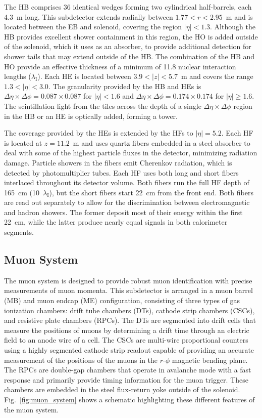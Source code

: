 The HB comprises 36 identical wedges forming two cylindrical half-barrels, each 4.3~m long. This subdetector extends radially between $1.77 < r < 2.95$~m and is located between the EB and solenoid, covering the region $|\eta| < 1.3$. Although the HB provides excellent shower containment in this region, the HO is added outside of the solenoid, which it uses as an absorber, to provide additional detection for shower tails that may extend outside of the HB. The combination of the HB and HO provide an effective thickness of a minimum of 11.8 nuclear interaction lengths ($\lambda_\mathrm{I}$). Each HE is located between $3.9 < |z| < 5.7$~m  and covers the range $1.3 < |\eta| < 3.0$. The granularity provided by the HB and HEs is $\Delta\eta{\times}\Delta\phi = 0.087{\times}0.087$ for $|\eta| < 1.6$ and $\Delta\eta{\times}\Delta\phi = 0.174{\times}0.174$ for $|\eta| \ge 1.6$. The scintillation light from the tiles across the depth of a single $\Delta\eta{\times}\Delta\phi$ region in the HB or an HE is optically added, forming a tower.

The coverage provided by the HEs is extended by the HFs to $|\eta| = 5.2$. Each HF is located at $z = 11.2$~m and uses quartz fibers embedded in a steel absorber to deal with some of the highest particle fluxes in the detector, minimizing radiation damage. Particle showers in the fibers emit Cherenkov radiation, which is detected by photomultiplier tubes. Each HF uses both long and short fibers interlaced throughout its detector volume. Both fibers run the full HF depth of 165~cm (10~$\lambda_\mathrm{I}$), but the short fibers start 22~cm from the front end. Both fibers are read out separately to allow for the discrimination between electromagnetic and hadron showers. The former deposit most of their energy within the first 22~cm, while the latter produce nearly equal signals in both calorimeter segments.


\subsection{Muon System}

The muon system is designed to provide robust muon identification with precise measurements of muon momenta. This subdetector is arranged in a muon barrel (MB) and muon endcap (ME) configuration, consisting of three types of gas ionization chambers: drift tube chambers (DTs), cathode strip chambers (CSCs), and resistive plate chambers (RPCs). The DTs are segmented into drift cells that measure the positions of muons by determining a drift time through an electric field to an anode wire of a cell. The CSCs are multi-wire proportional counters using a highly segmented cathode strip readout capable of providing an accurate measurement of the positions of the muons in the $r$-$\phi$ magnetic bending plane. The RPCs are double-gap chambers that operate in avalanche mode with a fast response and primarily provide timing information for the muon trigger. These chambers are embedded in the steel flux-return yoke outside of the solenoid. Fig.~\ref{fig:muon_system} shows a schematic highlighting these different features of the muon system.

